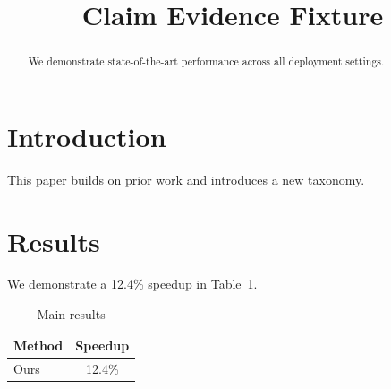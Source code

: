 \title{Claim Evidence Fixture}

\begin{abstract}
We demonstrate state-of-the-art performance across all deployment settings.
\end{abstract}

\section{Introduction}
This paper builds on prior work \cite{smith2020} and introduces a new taxonomy.

\section{Results}
We demonstrate a 12.4\% speedup in Table~\ref{tab:main}.

\begin{table}
\caption{Main results}
\label{tab:main}
\begin{tabular}{lc}
\toprule
Method & Speedup \\
\midrule
Ours & 12.4\% \\
\bottomrule
\end{tabular}
\end{table}

